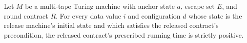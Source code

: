 \begin{theorem}
\label{Turing.RoundContract.release_positive}
\leanok
{}
Let $M$ be a multi-tape Turing machine with anchor state $a$, escape set $E$, and round
contract $R$. For every data value $i$ and configuration $d$ whose state is the release
machine's initial state and which satisfies the released contract's precondition, the
released contract's prescribed running time is strictly positive.
\end{theorem}
